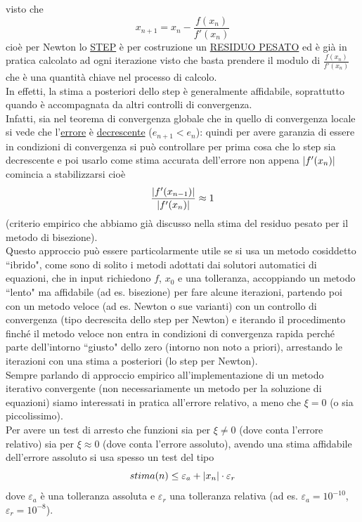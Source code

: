 \documentclass[12pt]{article}
\DeclarePairedDelimiter{\abs}{\lvert}{\rvert}
\begin{document}
visto che 
\[x_{n+1} = x_n - \frac{f(x_n)}{f'(x_n)}\]
cioè per Newton lo \uline{STEP} è per costruzione un \uline{RESIDUO PESATO} ed è già in pratica calcolato ad ogni iterazione visto che basta prendere il modulo di $\frac{f(x_n)}{f'(x_n)}$ che è una quantità chiave nel processo di calcolo.\\
In effetti, la stima a posteriori dello step è generalmente affidabile, soprattutto quando è accompagnata da altri controlli di convergenza.\\
Infatti, sia nel teorema di convergenza globale che in quello di convergenza locale si vede che l'\uline{errore} è \uline{decrescente} ($e_{n+1} < e_n$): quindi per avere garanzia di essere in condizioni di convergenza si può controllare per prima cosa che lo step sia decrescente e poi usarlo come stima accurata dell'errore non appena $\abs{f'(x_n)}$ comincia a stabilizzarsi cioè 
\[\frac{\abs{f'(x_{n-1})}}{\abs{f'(x_n)}} \approx 1\] 
(criterio empirico che abbiamo già discusso nella stima del residuo pesato per il metodo di bisezione).\\
Questo approccio può essere particolarmente utile se si usa un metodo cosiddetto ``ibrido", come sono di solito i metodi adottati dai solutori automatici di equazioni, che in input richiedono $f$, $x_0$ e una tolleranza, accoppiando un metodo ``lento" ma affidabile (ad es. bisezione) per fare alcune iterazioni, partendo poi con un metodo veloce (ad es. Newton o sue varianti) con un controllo di convergenza (tipo decrescita dello step per Newton) e iterando il procedimento finché il metodo veloce non entra in condizioni di convergenza rapida perché parte dell'intorno ``giusto" dello zero (intorno non noto a priori), arrestando le iterazioni con una stima a posteriori (lo step per Newton).\\
Sempre parlando di approccio empirico all'implementazione di un metodo iterativo convergente (non necessariamente un metodo per la soluzione di equazioni) siamo interessati in pratica all'errore relativo, a meno che $\xi = 0$ (o sia piccolissimo).\\
Per avere un test di arresto che funzioni sia per $\xi \neq 0$ (dove conta l'errore relativo) sia per $\xi \approx 0$ (dove conta l'errore assoluto), avendo una stima affidabile dell'errore assoluto si usa spesso un test del tipo
\[stima(n) \leq \varepsilon_a + \abs{x_n} \cdot \varepsilon_r\]
dove $\varepsilon_a$ è una tolleranza assoluta e $\varepsilon_r$ una tolleranza relativa (ad es. $\varepsilon_a = 10^{-10}$, $\varepsilon_r = 10^{-8}$).\\
\end{document}
